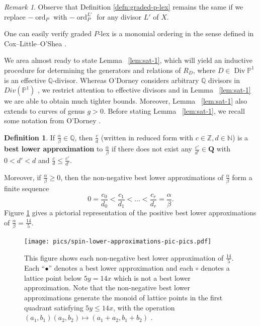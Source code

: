 \documentclass{amsart}
\theoremstyle{plain}
\theoremstyle{definition}
\newtheorem{defn}[thm]{Definition}
\theoremstyle{remark}
\newtheorem{rem}[thm]{Remark}
\numberwithin{equation}{section}
\newcommand\BQ{{\mathbb Q}}
\newcommand\BP{{\mathbb P}}
\DeclareMathOperator\di{Div}
\DeclareMathOperator{\ord}{ord}
\begin{document}
\begin{rem}\label{rem:graded-P-lex-independent-of-line-bundle}
Observe that Definition \ref{defn:graded-p-lex} remains the same if we replace $-\ord_P$ with $-\ord_P^{L'}$ for any divisor $L'$ of $X$.
\end{rem}

\noindent One can easily verify graded $P$-lex is a monomial ordering in the sense defined in Cox--Little--O'Shea \cite[Chapter 2, $\mathsection$ 2, Definition 1]{cls:ideals-varieties-algorithms}.

We area almost ready to state Lemma ~\ref{lem:sat-1}, which will yield an inductive procedure for determining the generators and relations of $R_D$, where $D \in \di \BP^1$ is an effective $
\mathbb{Q}$-divisor. Whereas O'Dorney considers arbitrary $\mathbb{Q}$ divisors in $Div(\mathbb{P}^1)$ \cite[Theorem 8]{dorney:canonical}, we restrict attention to effective divisors and in Lemma ~\ref{lem:sat-1} we are able to obtain much tighter bounds.  Moreover, Lemma ~\ref{lem:sat-1} also extends to curves of genus $g > 0$. Before stating Lemma ~\ref{lem:sat-1}, we recall some notation from O'Dorney \cite{dorney:canonical}.

\begin{defn}\label{den:lower-approximation}
If $\frac{\alpha}{\beta}\in \BQ$, then $\frac{c}{d}$ (written in reduced form with $c\in \mathbb{Z}, d\in \mathbb{N}$) is a {\bf{best lower approximation}} to $\frac{\alpha}{\beta}$ if there does not exist any $\frac{c'}{d'}\in \mathbf{Q}$ with $0<d'<d$ and $\frac{c}{d}\le \frac{c'}{d'}$. 
\end{defn}
Moreover, if $\frac{\alpha}{\beta}\ge 0$, then the non-negative best lower approximations of $\frac{\alpha}{\beta}$ form a finite sequence
\[
	0=\frac{c_0}{d_0} < \frac{c_1}{d_1} < \ldots < \frac{c_r}{d_r} = \frac{\alpha}{\beta}.
\]
Figure \ref{fig:s14/5-lattice} gives a pictorial representation of the positive best lower approximations of $\frac{\alpha}{\beta}=\frac{14}{5}$.

\begin{figure}\label{fig:s14/5-lattice}
\texttt{[image: pics/spin-lower-approximations-pic-pics.pdf]}
\caption{This figure shows each non-negative best lower approximation of $\frac{14}{5}.$ Each ``$\bullet$'' denotes a best lower approximation and each $\circ$ denotes a lattice point below $5y=14x$ which is not a best lower approximation.  Note that the non-negative best lower approximations generate the monoid of lattice points in the first quadrant satisfying  $5y \le 14x$, with the operation $(a_1, b_1)(a_2, b_2)\mapsto (a_1 + a_2, b_1 + b_2)$ .}
\end{figure}
\end{document}
